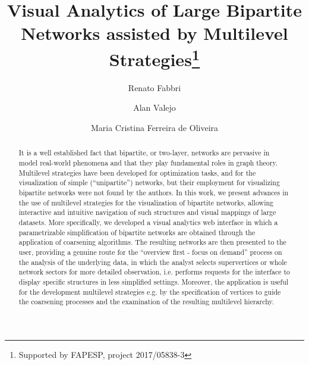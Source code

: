 \documentclass[runningheads]{llncs}
\begin{document}
%
\title{Visual Analytics of Large Bipartite Networks assisted by Multilevel Strategies\thanks{Supported by FAPESP, project 2017/05838-3}}
%
%
\author{Renato Fabbri \and
Alan Valejo \and
Maria Cristina Ferreira de Oliveira}
%
%
%
\maketitle
%
\begin{abstract}
  It is a well established fact that bipartite, or two-layer, networks are pervasive
  in model real-world phenomena and that they play fundamental roles in
  graph theory.
  Multilevel strategies have been developed for optimization tasks,
  and for the visualization of simple (``unipartite'') networks,
  but their employment for visualizing bipartite networks were not found by the authors.
  In this work, we present advances in the use of multilevel strategies for the
  visualization of bipartite networks,
  allowing interactive and intuitive navigation of such structures and visual mappings of large datasets.
  More specifically, we developed a visual analytics web interface in which
  a parametrizable simplification of
  bipartite networks are obtained through the application of coarsening algorithms.
  The resulting networks are then presented to the user,
  providing a genuine route for the ``overview first - focus on demand''
  process on the analysis of the underlying data, in which the analyst
  selects supervertices or whole network sectors for more detailed observation,
  i.e. performs requests for the interface to display 
  specific structures in less simplified settings.
  Moreover, the application is useful for the development multilevel strategies
  e.g. by the specification of vertices to guide the coarsening processes and
  the examination of the resulting multilevel hierarchy.

\end{abstract}
%
\end{document}
